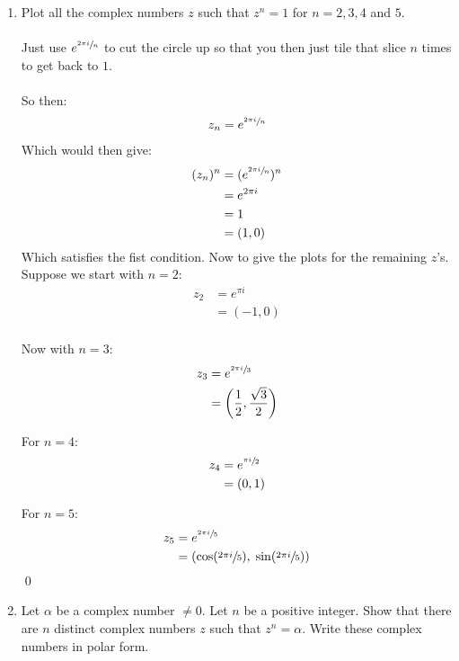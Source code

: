 \begin{enumerate}
	\item Plot all the complex numbers $z$ such that $z^n = 1$ for $ n = 2, 3, 4$ and $5.$ \\
	\\
	Just use $ e^{ \sfrac{2 \pi i}{n} } $ to cut the circle up so that you then just tile that slice $n$ times to get back to $1.$ \\
	\\
	So then:
	\begin{align*}
		z_n &= e^{ \sfrac{2 \pi i}{n} } \\
	\end{align*}
	Which would then give:
	\begin{align*}
		(z_n)^n &= ( e^{ \sfrac{2 \pi i}{n} } )^n \\
		&= e^{2 \pi i } \\
		&= 1 \\
		& = (1, 0) \\
	\end{align*}
	Which satisfies the fist condition. Now to give the plots for the remaining $z$'s.\\

	Suppose we start with $n = 2:$
	\begin{align*}
		z_2 &= e^{ \pi i}  \\
		&= (-1, 0) \\
	\end{align*}

	Now with $n = 3:$
	\begin{align*}
		z_3 &= e^{\sfrac{2 \pi i}{3}} \\
		&= \left( \frac{1}{2}, \frac{\sqrt{3}}{2} \right) \\
	\end{align*}

	For $n = 4:$ \\
	\begin{align*}
		z_4 &= e^{\sfrac{\pi i}{2}} \\
		&= ( 0, 1 )
	\end{align*}

	For $n = 5:$ \\
	\begin{align*}
		z_5 &= e^{\sfrac{2 \pi i}{5}} \\
		&= \left( \cos( \sfrac{2\pi i}{5}), \; \sin(\sfrac{2\pi i}{5}) \right)
	\end{align*}
	\qed


	\item Let $\alpha$ be a complex number $\neq 0.$ Let $n$ be a positive integer. Show that there are $n$ distinct complex numbers $z$ such that $z^n = \alpha.$ Write these complex numbers in polar form. \\
	

\end{enumerate}
